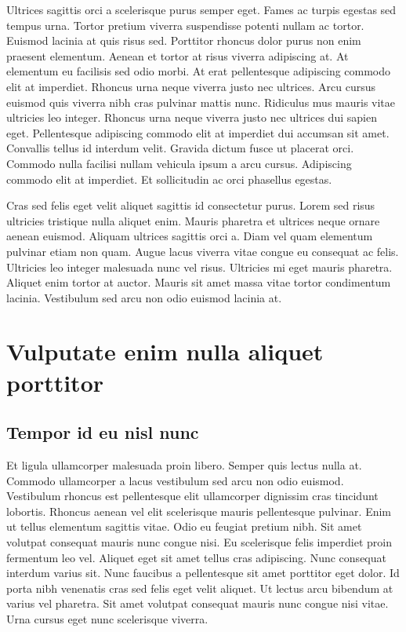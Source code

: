 \documentclass[uplatex, english, twocolumn]{jsarticle}
\begin{document}
Ultrices sagittis orci a scelerisque purus semper eget. Fames ac turpis egestas sed tempus urna. Tortor pretium viverra suspendisse potenti nullam ac tortor. Euismod lacinia at quis risus sed. Porttitor rhoncus dolor purus non enim praesent elementum. Aenean et tortor at risus viverra adipiscing at. At elementum eu facilisis sed odio morbi. At erat pellentesque adipiscing commodo elit at imperdiet. Rhoncus urna neque viverra justo nec ultrices. Arcu cursus euismod quis viverra nibh cras pulvinar mattis nunc. Ridiculus mus mauris vitae ultricies leo integer. Rhoncus urna neque viverra justo nec ultrices dui sapien eget. Pellentesque adipiscing commodo elit at imperdiet dui accumsan sit amet. Convallis tellus id interdum velit. Gravida dictum fusce ut placerat orci. Commodo nulla facilisi nullam vehicula ipsum a arcu cursus. Adipiscing commodo elit at imperdiet. Et sollicitudin ac orci phasellus egestas.

Cras sed felis eget velit aliquet sagittis id consectetur purus. Lorem sed risus ultricies tristique nulla aliquet enim. Mauris pharetra et ultrices neque ornare aenean euismod. Aliquam ultrices sagittis orci a. Diam vel quam elementum pulvinar etiam non quam. Augue lacus viverra vitae congue eu consequat ac felis. Ultricies leo integer malesuada nunc vel risus. Ultricies mi eget mauris pharetra. Aliquet enim tortor at auctor. Mauris sit amet massa vitae tortor condimentum lacinia. Vestibulum sed arcu non odio euismod lacinia at.

\section{Vulputate enim nulla aliquet porttitor}
\subsection{Tempor id eu nisl nunc}

Et ligula ullamcorper malesuada proin libero. Semper quis lectus nulla at. Commodo ullamcorper a lacus vestibulum sed arcu non odio euismod. Vestibulum rhoncus est pellentesque elit ullamcorper dignissim cras tincidunt lobortis. Rhoncus aenean vel elit scelerisque mauris pellentesque pulvinar. Enim ut tellus elementum sagittis vitae. Odio eu feugiat pretium nibh. Sit amet volutpat consequat mauris nunc congue nisi. Eu scelerisque felis imperdiet proin fermentum leo vel. Aliquet eget sit amet tellus cras adipiscing. Nunc consequat interdum varius sit. Nunc faucibus a pellentesque sit amet porttitor eget dolor. Id porta nibh venenatis cras sed felis eget velit aliquet. Ut lectus arcu bibendum at varius vel pharetra. Sit amet volutpat consequat mauris nunc congue nisi vitae. Urna cursus eget nunc scelerisque viverra.
\end{document}
